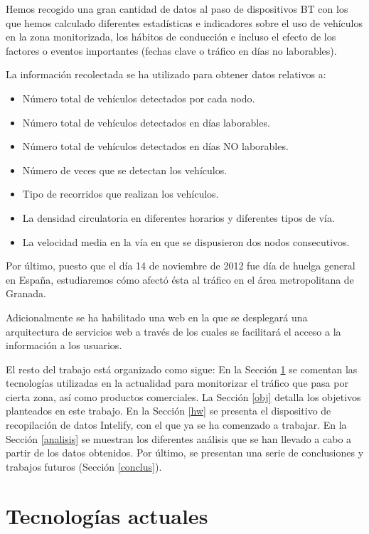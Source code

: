 \documentclass[twocolumn,twoside]{Jornadas}
\begin{document}
Hemos recogido una gran cantidad de datos al paso de dispositivos BT con los que hemos calculado diferentes estadísticas e indicadores sobre el uso de vehículos en la zona monitorizada, los hábitos de conducción e incluso el efecto de los factores o eventos importantes (fechas clave o tráfico en días no laborables).

La información recolectada se ha utilizado para obtener datos relativos a:
\begin{itemize}
 \item Número total de vehículos detectados por cada nodo.
 \item Número total de vehículos detectados en días laborables.
 \item Número total de vehículos detectados en días NO laborables.
 \item Número de veces que se detectan los vehículos.
 \item Tipo de recorridos que realizan los vehículos.
 \item La densidad circulatoria en diferentes horarios y diferentes tipos de vía.
 \item La velocidad media en la vía en que se dispusieron dos nodos consecutivos.
\end{itemize}

Por último, puesto que el día 14 de noviembre de 2012 fue día de huelga general en España, estudiaremos cómo afectó ésta al tráfico en el área metropolitana de Granada.


Adicionalmente se ha habilitado una web en la que se desplegará una arquitectura de servicios web \cite{Papazoglou2007,pgs2007} a través de los cuales se facilitará el acceso a la información a los usuarios.


El resto del trabajo está organizado como sigue:
En la Sección \ref{soa} se comentan las tecnologías utilizadas en la actualidad para monitorizar el tráfico que pasa por cierta zona, así como productos comerciales.
La Sección \ref{obj} detalla los objetivos planteados en este trabajo.
En la Sección \ref{hw} se presenta el dispositivo de recopilación de datos Intelify, con el que ya se ha comenzado a trabajar.
En la Sección \ref{analisis} se muestran los diferentes análisis que se han llevado a cabo a partir de los datos obtenidos.
Por último, se presentan una serie de conclusiones y trabajos futuros (Sección \ref{conclus}).


\section{Tecnologías actuales}
\label{soa}
\end{document}
